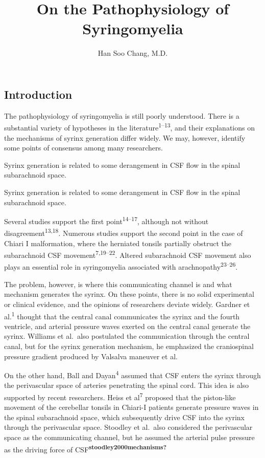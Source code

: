 \documentclass[a4paper,12pt]{article}
\title{On the Pathophysiology of Syringomyelia}
\author{Han Soo Chang, M.D.}
\date{}
\begin{document}
\maketitle
\subsection{Introduction}

The pathophysiology of syringomyelia is still poorly understood. There is a substantial variety of hypotheses in the literature\textsuperscript{1--13}, and their explanations on the mechanisms of syrinx generation differ widely. We may, however, identify some points of consensus among many researchers.

Syrinx generation is related to some derangement in CSF flow in the spinal subarachnoid space.

Syrinx generation is related to some derangement in CSF flow in the spinal subarachnoid space.

Several studies support the first point\textsuperscript{14--17}, although not without disagreement\textsuperscript{13,18}. Numerous studies support the second point in the case of Chiari I malformation, where the herniated tonsils partially obstruct the subarachnoid CSF movement\textsuperscript{7,19--22}. Altered subarachnoid CSF movement also plays an essential role in syringomyelia associated with arachnopathy\textsuperscript{23--26}.

The problem, however, is where this communicating channel is and what mechanism generates the syrinx. On these points, there is no solid experimental or clinical evidence, and the opinions of researchers deviate widely. Gardner et al.\textsuperscript{1} thought that the central canal communicates the syrinx and the fourth ventricle, and arterial pressure waves exerted on the central canal generate the syrinx. Williams et al.~also postulated the communication through the central canal, but for the syrinx generation mechanism, he emphasized the craniospinal pressure gradient produced by Valsalva maneuver et al.

On the other hand, Ball and Dayan\textsuperscript{4} assumed that CSF enters the syrinx through the perivascular space of arteries penetrating the spinal cord. This idea is also supported by recent researchers. Heiss et al\textsuperscript{7} proposed that the piston-like movement of the cerebellar tonsils in Chiari-I patients generate pressure waves in the spinal subarachnoid space, which subsequently drive CSF into the syrinx through the perivascular space. Stoodley et al.~also considered the perivascular space as the communicating channel, but he assumed the arterial pulse pressure as the driving force of CSF\textsuperscript{\textbf{stoodley2000mechanisms?}}
\end{document}
